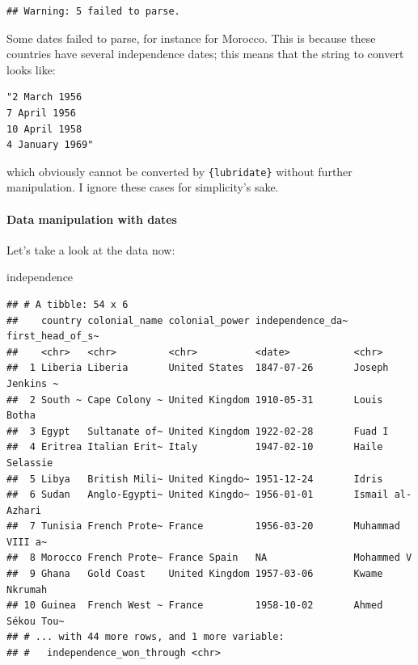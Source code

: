 \documentclass[]{gitbook}
\newenvironment{Shaded}{\begin{snugshade}}{\end{snugshade}}
\newcommand{\NormalTok}[1]{#1}
\let\oldparagraph\paragraph
\renewcommand{\paragraph}[1]{\oldparagraph{#1}\mbox{}}
\begin{document}
\begin{verbatim}
## Warning: 5 failed to parse.
\end{verbatim}

Some dates failed to parse, for instance for Morocco. This is because these countries have several
independence dates; this means that the string to convert looks like:

\begin{verbatim}
"2 March 1956
7 April 1956
10 April 1958
4 January 1969"
\end{verbatim}

which obviously cannot be converted by \texttt{\{lubridate\}} without further manipulation. I ignore these cases for
simplicity's sake.

\hypertarget{data-manipulation-with-dates}{%
\paragraph{Data manipulation with dates}\label{data-manipulation-with-dates}}

Let's take a look at the data now:

\begin{Shaded}
\begin{Highlighting}[]
\NormalTok{independence}
\end{Highlighting}
\end{Shaded}

\begin{verbatim}
## # A tibble: 54 x 6
##    country colonial_name colonial_power independence_da~ first_head_of_s~
##    <chr>   <chr>         <chr>          <date>           <chr>           
##  1 Liberia Liberia       United States  1847-07-26       Joseph Jenkins ~
##  2 South ~ Cape Colony ~ United Kingdom 1910-05-31       Louis Botha     
##  3 Egypt   Sultanate of~ United Kingdom 1922-02-28       Fuad I          
##  4 Eritrea Italian Erit~ Italy          1947-02-10       Haile Selassie  
##  5 Libya   British Mili~ United Kingdo~ 1951-12-24       Idris           
##  6 Sudan   Anglo-Egypti~ United Kingdo~ 1956-01-01       Ismail al-Azhari
##  7 Tunisia French Prote~ France         1956-03-20       Muhammad VIII a~
##  8 Morocco French Prote~ France Spain   NA               Mohammed V      
##  9 Ghana   Gold Coast    United Kingdom 1957-03-06       Kwame Nkrumah   
## 10 Guinea  French West ~ France         1958-10-02       Ahmed Sékou Tou~
## # ... with 44 more rows, and 1 more variable:
## #   independence_won_through <chr>
\end{verbatim}
\end{document}
